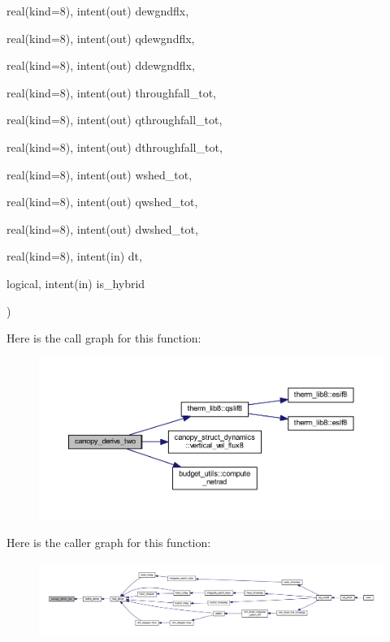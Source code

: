 {\begin{DoxyParamCaption}
\item[{real(kind=8), intent(out)}]{dewgndflx, }
\item[{real(kind=8), intent(out)}]{qdewgndflx, }
\item[{real(kind=8), intent(out)}]{ddewgndflx, }
\item[{real(kind=8), intent(out)}]{throughfall\+\_\+tot, }
\item[{real(kind=8), intent(out)}]{qthroughfall\+\_\+tot, }
\item[{real(kind=8), intent(out)}]{dthroughfall\+\_\+tot, }
\item[{real(kind=8), intent(out)}]{wshed\+\_\+tot, }
\item[{real(kind=8), intent(out)}]{qwshed\+\_\+tot, }
\item[{real(kind=8), intent(out)}]{dwshed\+\_\+tot, }
\item[{real(kind=8), intent(in)}]{dt, }
\item[{logical, intent(in)}]{is\+\_\+hybrid}
\end{DoxyParamCaption}
)}\hypertarget{rk4__derivs_8_f90_a14ce7bded127d7e1f0c8fb55c99100e2}{}\label{rk4__derivs_8_f90_a14ce7bded127d7e1f0c8fb55c99100e2}


Here is the call graph for this function\+:\nopagebreak
\begin{figure}[H]
\begin{center}
\leavevmode
\includegraphics[width=350pt]{rk4__derivs_8_f90_a14ce7bded127d7e1f0c8fb55c99100e2_cgraph}
\end{center}
\end{figure}




Here is the caller graph for this function\+:\nopagebreak
\begin{figure}[H]
\begin{center}
\leavevmode
\includegraphics[width=350pt]{rk4__derivs_8_f90_a14ce7bded127d7e1f0c8fb55c99100e2_icgraph}
\end{center}
\end{figure}


